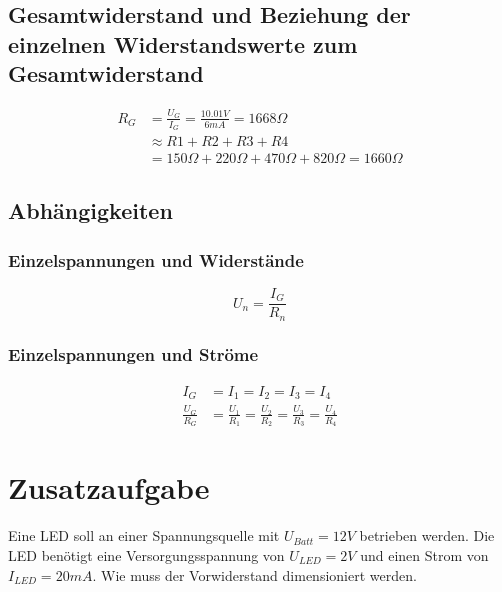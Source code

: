 \documentclass[
a4paper,     %
12pt         %
]{scrartcl}  %
\begin{document}
\subsection{Gesamtwiderstand und Beziehung der einzelnen Widerstandswerte zum Gesamtwiderstand}


\begin{align}
R_{G} & =\frac{U_{G}}{I_{G}} = \frac{10.01V}{6mA} =  1668 \Omega \nonumber \\
      & \approx R{1}+R{2}+R{3}+R{4} \nonumber \\
      & = 150\Omega + 220\Omega + 470\Omega + 820\Omega = 1660\Omega \nonumber 
\end{align}




\subsection{Abhängigkeiten}
\subsubsection{Einzelspannungen und Widerstände}
\[U_n = \frac{I_G}{R_n}\]
\subsubsection{Einzelspannungen und Ströme}
\begin{align}
I_G & = I_1 = I_2 = I_3 = I_4 \nonumber \\
\frac{U_G}{R_G} & =\frac{U_1}{R_1}=\frac{U_2}{R_2}=\frac{U_3}{R_3}=\frac{U_4}{R_4} \nonumber
\end{align}

\section{Zusatzaufgabe}
Eine LED soll an einer Spannungsquelle mit $U_{Batt}=12V$ betrieben werden. Die LED benötigt eine Versorgungsspannung von $U_{LED}=2V$ und einen Strom von $I_{LED}=20mA$. Wie muss der Vorwiderstand dimensioniert werden.
\end{document}

